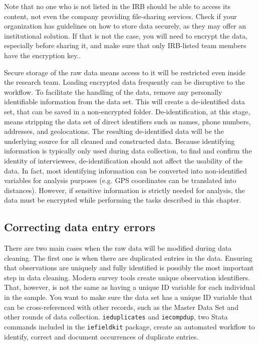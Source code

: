 Note that no one who is not listed in the IRB should be able to access its content, not even the company providing file-sharing services.
Check if your organization has guidelines on how to store data securely, as they may offer an institutional solution. 
If that is not the case, you will need to encrypt the data, especially before
sharing it, and make sure that only IRB-listed team members have the
encryption key..

Secure storage of the raw data means access to it will be restricted even inside the research team.
Loading encrypted data frequently can be disruptive to the workflow.
To facilitate the handling of the data, remove any personally identifiable information from the data set.
This will create a de-identified data set, that can be saved in a non-encrypted folder. 
De-identification,
at this stage, means stripping the data set of direct identifiers such as names, phone numbers, addresses, and geolocations.
The resulting de-identified data will be the underlying source for all cleaned and constructed data.
Because identifying information is typically only used during data collection, 
to find and confirm the identity of interviewees, 
de-identification should not affect the usability of the data.
In fact, most identifying information can be converted into non-identified variables for analysis purposes
(e.g. GPS coordinates can be translated into distances). 
However, if sensitive information is strictly needed for analysis, 
the data must be encrypted while performing the tasks described in this chapter.

\subsection{Correcting data entry errors}

There are two main cases when the raw data will be modified during data cleaning.
The first one is when there are duplicated entries in the data.
Ensuring that observations are uniquely and fully identified
is possibly the most important step in data cleaning.
Modern survey tools create unique observation identifiers.
That, however, is not the same as having a unique ID variable for each individual in the sample.
You want to make sure the data set has a unique ID variable
that can be cross-referenced with other records, such as the Master Data Set
and other rounds of data collection.
\texttt{ieduplicates} and \texttt{iecompdup}, 
two Stata commands included in the \texttt{iefieldkit} 
package,
create an automated workflow to identify, correct and document
occurrences of duplicate entries. 

